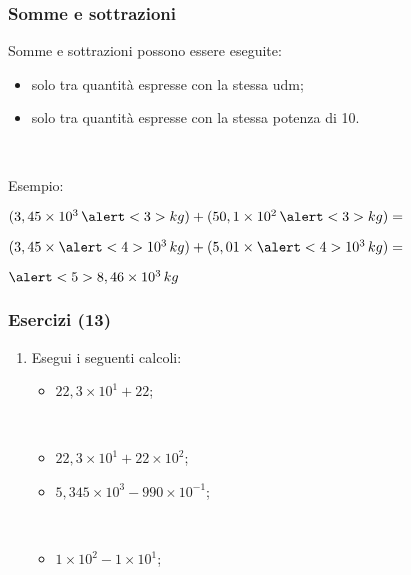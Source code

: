 \documentclass[]{beamer}
\begin{document}
\begin{frame}
\frametitle{Somme e sottrazioni}
Somme e sottrazioni possono essere eseguite:
\begin{itemize}
  \item solo tra quantità espresse con \alert<1-2>{la stessa udm};\pause
  \item solo tra quantità espresse con \alert<2>{la stessa potenza di 10}.
\end{itemize}\pause

~

Esempio:
\begin{center}
$ (3,45 \times 10^3 \,  \alert<3>{kg}) + (50,1 \times 10^2 \,  \alert<3>{kg}) = $\pause

\vspace{.3cm}

$ (3,45 \times \alert<4>{10^3} \, kg) + (5,01 \times \alert<4>{10^3} \, kg) =  $\pause

\vspace{.3cm}

$ \alert<5>{8,46 \times 10^3 \, kg} $
\end{center}
\end{frame}


\begin{frame}
\frametitle{Esercizi (13)}
\begin{enumerate}
  \item Esegui i seguenti calcoli:
  \begin{multicols}{2}
    \begin{itemize}
        \item $ 22,3 \times 10^{1} + 22 $;
        
        ~

        \item $ 22,3 \times 10^{1} + 22 \times 10^{2} $;
        \item $ 5,345 \times 10^{3} - 990 \times 10^{-1} $;
        
        ~

        \item $ 1 \times 10^{2} - 1 \times 10^{1} $;
    \end{itemize}
  \end{multicols}
\end{enumerate}
\end{frame}
\end{document}

